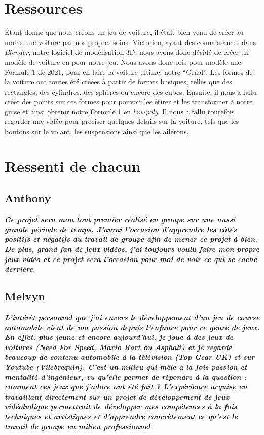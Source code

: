 \documentclass[12pt,a4paper]{article}
\begin{document}
\clearpage
\section{Ressources}
Étant donné que nous créons un jeu de voiture, il était bien venu de créer %
au moins une voiture par nos propres soins. 
Victorien, ayant des connaissances dans \textit{Blender}, notre logiciel de modélisation 3D, nous avons donc décidé de créer un modèle de voiture en pour notre jeu. 
Nous avons donc pris pour modèle une Formule 1 de 2021, pour en faire la voiture ultime, notre “Graal”. 
Les formes de la voiture ont toutes été créées à partir de formes basiques, telles que des rectangles, des cylindres, des sphères ou encore des cubes. 
Ensuite, il nous a fallu créer des points sur ces formes pour pouvoir les étirer et les transformer à notre guise et ainsi obtenir notre Formule 1 en \textit{low-poly}. %
Il nous a fallu %
toutefois regarder une vidéo pour préciser quelques détails sur la voiture, tels que les boutons sur le volant, les suspensions ainsi que les ailerons. 

\clearpage
\section{Ressenti de chacun}

  \subsection{Anthony}
  \indent\textit{\bfseries Ce projet sera mon tout premier réalisé en groupe sur une aussi 
  grande période de temps. J'aurai l'occasion d'apprendre les côtés positifs et 
  négatifs du travail de groupe afin de mener ce projet à bien. De plus, grand
  fan de jeux vidéos, j'ai toujours voulu faire mon propre jeux vidéo et ce 
  projet sera l'occasion pour moi de voir ce qui se cache derrière.}
  \subsection{Melvyn}
  
  \indent\textit{\bfseries L'intérêt personnel que j'ai envers le développement d'un jeu 
  de course automobile vient de ma passion depuis l'enfance pour ce genre de 
  jeux. En effet, plus jeune et encore aujourd'hui, je joue à des jeux de 
  voitures (Need For Speed, Mario Kart ou Asphalt) et je regarde beaucoup 
  de contenu automobile à la télévision (Top Gear UK) et sur Youtube 
  (Vilebrequin). C'est un milieu qui mêle à la fois passion et mentalité 
  d'ingénieur, vu qu'elle permet de répondre à la question : comment ces 
  jeux que j'adore ont été fait ? L'expérience acquise en travaillant 
  directement sur un projet de développement de jeux vidéoludique 
  permettrait de développer mes compétences à la fois techniques et 
  artistiques et d'apprendre concrètement ce qu'est le travail de groupe en 
  milieu professionnel}
 
\end{document}
